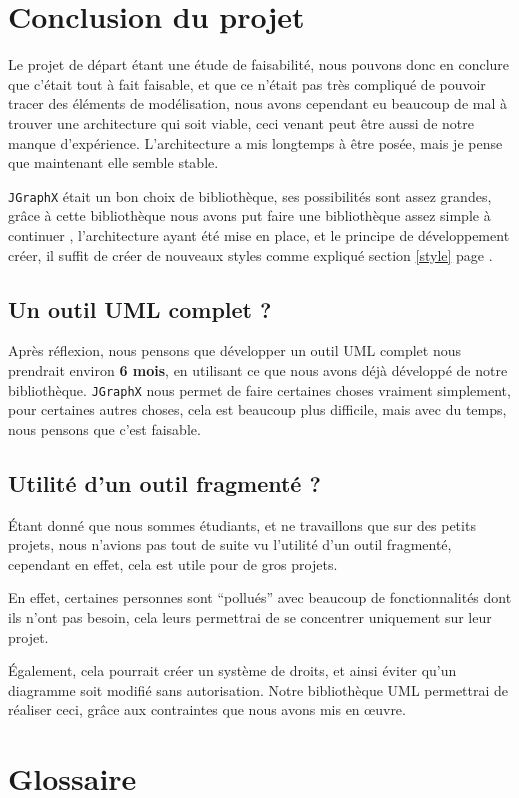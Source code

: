 \documentclass[12pt,a4paper,oneside]{book}
\begin{document}
	\chapter{Conclusion du projet}
	\nouveauChapitre
	Le projet de départ étant une étude de faisabilité, nous pouvons donc en conclure que c'était tout à fait faisable, et que ce n'était pas très compliqué de pouvoir
	tracer des éléments de modélisation, nous avons cependant eu beaucoup de mal à trouver une architecture qui soit viable, ceci venant peut être aussi de notre manque
	d'expérience. L'architecture a mis longtemps à être posée, mais je pense que maintenant elle semble stable.

	\texttt{JGraphX} était un bon choix de bibliothèque, ses possibilités sont assez grandes, grâce à cette bibliothèque nous avons put faire une bibliothèque assez simple à continuer
,
l'architecture ayant été mise en place, et le principe de développement créer, il suffit de créer de nouveaux styles comme expliqué section \ref{style} page \pageref{style}. 
	\section{Un outil UML complet ?}
	Après réflexion, nous pensons que développer un outil UML complet nous prendrait environ\textbf{ 6 mois}, 
	en utilisant ce que nous avons déjà développé de notre bibliothèque. \texttt{JGraphX} nous permet de faire certaines choses vraiment simplement, pour certaines autres choses, cela
	est beaucoup plus difficile, mais avec du temps, nous pensons que c'est faisable. 
	\section{Utilité d'un outil fragmenté ?}
	Étant donné que nous sommes étudiants, et ne travaillons que sur des petits projets, nous n'avions pas tout de suite vu l'utilité d'un outil fragmenté, cependant
en effet, cela est utile pour de gros projets. 

En effet, certaines personnes sont ``pollués'' avec beaucoup de fonctionnalités dont ils n'ont pas besoin,
cela leurs permettrai de se concentrer uniquement sur leur projet. 

Également, cela pourrait créer un système de droits, et ainsi éviter qu'un diagramme soit modifié
sans autorisation. Notre bibliothèque UML permettrai de réaliser ceci, grâce aux contraintes que nous avons mis en \oe{}uvre.
	
	\closeout\glossaireVar
	\appendix
	\chapter{Glossaire}\label{glossaire}
	\nouveauChapitre
	\begin{sortedlist}
		
	\end{sortedlist}
\end{document}
